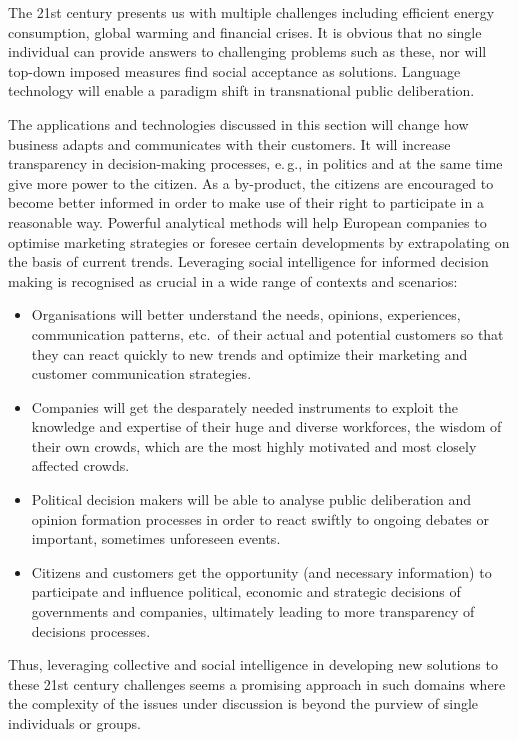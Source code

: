 \documentclass[10pt, plain]{../../metanetpaper}
\begin{document}
\begin{multicols}{2}
The 21st century presents us with multiple challenges including efficient energy consumption, global warming and financial crises. It is obvious that no single individual can provide answers to challenging problems such as these, nor will top-down imposed measures find social acceptance as solutions. Language technology will enable a paradigm shift in transnational public deliberation.
 
The applications and technologies discussed in this section will change how business adapts and communicates with their customers. It will increase transparency in decision-making processes, e.\,g., in politics and at the same time give more power to the citizen. As a by-product, the citizens are encouraged to become better informed in order to make use of their right to participate in a reasonable way. Powerful analytical methods will help European companies to optimise marketing strategies or foresee certain developments by extrapolating on the basis of current trends. Leveraging social intelligence for informed decision making is recognised as crucial in a wide range of contexts and scenarios:

\begin{itemize}
\item Organisations will better understand the needs, opinions, experiences, communication patterns, etc.~of their actual and potential customers so that they can react quickly to new trends and optimize their marketing and customer communication strategies.
\item Companies will get the desparately needed instruments to exploit the knowledge and expertise of their huge and diverse workforces, the wisdom of their own crowds, which are the most highly motivated and most closely affected crowds.
\item Political decision makers will be able to analyse public deliberation and opinion formation processes in order to react swiftly to ongoing debates or important, sometimes unforeseen events.
\item Citizens and customers get the opportunity (and necessary information) to participate and influence political, economic and strategic decisions of governments and companies, ultimately leading to more transparency of decisions processes.
\end{itemize}

Thus, leveraging collective and social intelligence in developing new solutions to these 21st century challenges seems a promising approach in such domains where the complexity of the issues under discussion is beyond the purview of single individuals or groups.


\end{multicols}
\end{document}
